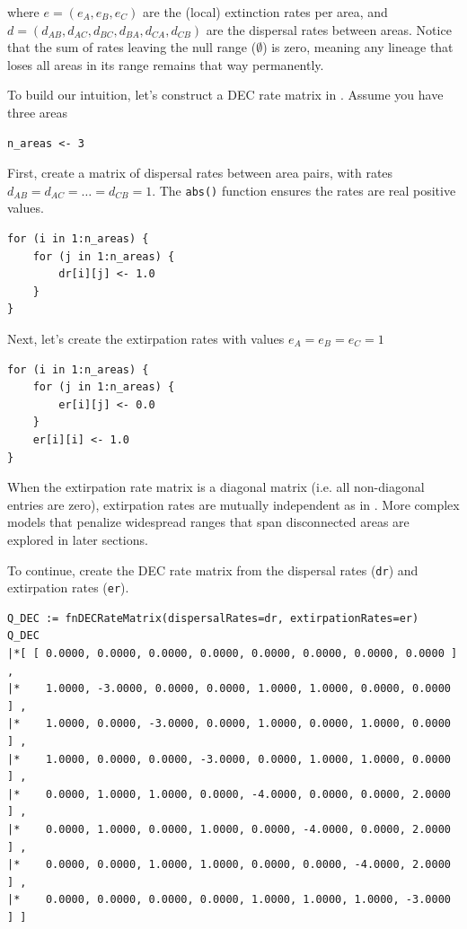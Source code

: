 where $e = ( e_A, e_B, e_C )$ are the (local) extinction rates per area, and $d = ( d_{AB}, d_{AC}, d_{BC}, d_{BA}, d_{CA}, d_{CB})$ are the dispersal rates between areas.
Notice that the sum of rates leaving the null range ($\emptyset$) is zero, meaning any lineage that loses all areas in its range remains that way permanently.

To build our intuition, let's construct a DEC rate matrix in \RevBayes.
Assume you have three areas

\begin{snugshade}
\begin{lstlisting}
n_areas <- 3
\end{lstlisting}
\end{snugshade}

First, create a matrix of dispersal rates between area pairs, with rates $d_{AB} = d_{AC} = \ldots = d_{CB} = 1$. The {\tt abs()} function ensures the rates are real positive values.

\begin{snugshade}
\begin{lstlisting}
for (i in 1:n_areas) {
    for (j in 1:n_areas) {
        dr[i][j] <- 1.0
    }
}
\end{lstlisting}
\end{snugshade}

Next, let's create the extirpation rates with values $e_A=e_B=e_C=1$

\begin{snugshade}
\begin{lstlisting}
for (i in 1:n_areas) {
    for (j in 1:n_areas) {
        er[i][j] <- 0.0
    }
    er[i][i] <- 1.0 
}
\end{lstlisting}
\end{snugshade}

When the extirpation rate matrix is a diagonal matrix (i.e. all non-diagonal entries are zero), extirpation rates are mutually independent as in \citep{Ree2005}.
More complex models that penalize widespread ranges that span disconnected areas are explored in later sections.

To continue, create the DEC rate matrix from the dispersal rates ({\tt dr}) and extirpation rates ({\tt er}).

\begin{snugshade}
\begin{lstlisting}
Q_DEC := fnDECRateMatrix(dispersalRates=dr, extirpationRates=er)
Q_DEC
|*[ [ 0.0000, 0.0000, 0.0000, 0.0000, 0.0000, 0.0000, 0.0000, 0.0000 ] ,
|*    1.0000, -3.0000, 0.0000, 0.0000, 1.0000, 1.0000, 0.0000, 0.0000 ] ,
|*    1.0000, 0.0000, -3.0000, 0.0000, 1.0000, 0.0000, 1.0000, 0.0000 ] ,
|*    1.0000, 0.0000, 0.0000, -3.0000, 0.0000, 1.0000, 1.0000, 0.0000 ] ,
|*    0.0000, 1.0000, 1.0000, 0.0000, -4.0000, 0.0000, 0.0000, 2.0000 ] ,
|*    0.0000, 1.0000, 0.0000, 1.0000, 0.0000, -4.0000, 0.0000, 2.0000 ] ,
|*    0.0000, 0.0000, 1.0000, 1.0000, 0.0000, 0.0000, -4.0000, 2.0000 ] ,
|*    0.0000, 0.0000, 0.0000, 0.0000, 1.0000, 1.0000, 1.0000, -3.0000 ] ]
\end{lstlisting}
\end{snugshade}

